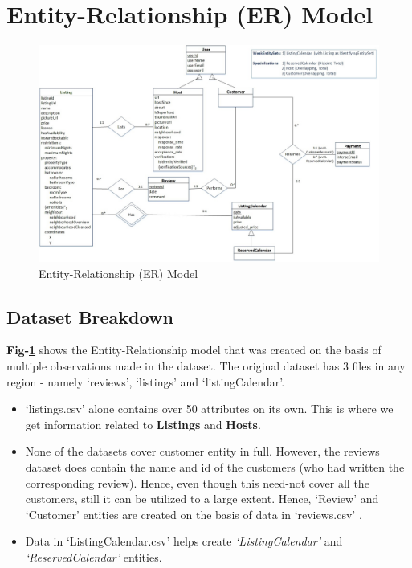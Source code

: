\documentclass[conference]{IEEEtran}
\begin{document}
\section{\textbf{Entity-Relationship (ER) Model}}
    \begin{figure}[t]
        \centering
		\includegraphics[width=1\textwidth]{../ER_Model/ER_Model.JPG}
		\caption{Entity-Relationship (ER) Model} \label{fig_2}
	\end{figure}

\subsection{\textbf{Dataset Breakdown}}
\textbf{Fig-\ref{fig_2}} shows the Entity-Relationship model that was created on the basis of multiple observations made in the dataset. The original dataset \cite{1_Airbnb} has 3 files in any region - namely ‘reviews’, ‘listings’ and ‘listingCalendar’.
    \begin{itemize}
        \item ‘listings.csv’ \cite{1_Airbnb} alone contains over 50 attributes on its own. This is where we get information related to \textbf{Listings} and \textbf{Hosts}.
        \vspace{1mm}
        \item None of the datasets cover customer entity in full. However, the reviews dataset does contain the name and id of the customers (who had written the corresponding review). Hence, even though this need-not cover all the customers, still it can be utilized to a large extent. Hence, ‘Review’ and ‘Customer’ entities are created on the basis of data in ‘reviews.csv’ \cite{1_Airbnb}.
        \vspace{1mm}
        \item Data in ‘ListingCalendar.csv’ helps create \textit{‘ListingCalendar’} and \textit{‘ReservedCalendar’} entities.
    \end{itemize}
\end{document}
